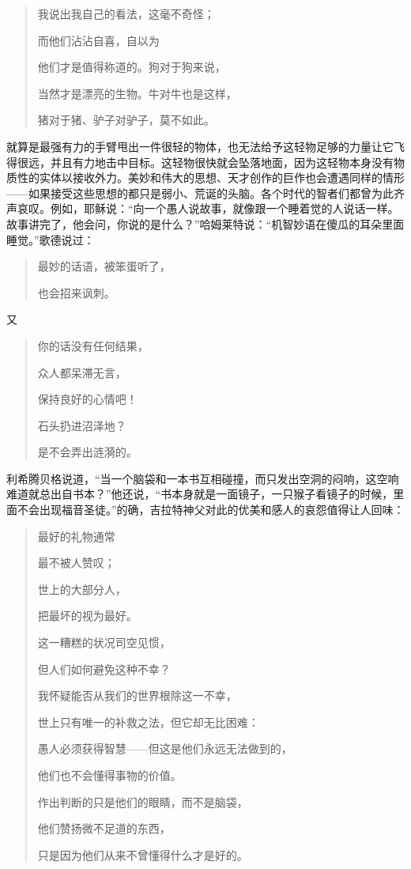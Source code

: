 \documentclass[12pt,oneside]{book}
\begin{document}
 
\begin{quotation}
我说出我自己的看法，这毫不奇怪；

而他们沾沾自喜，自以为 

他们才是值得称道的。狗对于狗来说， 

当然才是漂亮的生物。牛对牛也是这样， 

猪对于猪、驴子对驴子，莫不如此。 
\end{quotation}


就算是最强有力的手臂甩出一件很轻的物体，也无法给予这轻物足够的力量让它飞得很远，并且有力地击中目标。这轻物很快就会坠落地面，因为这轻物本身没有物质性的实体以接收外力。美妙和伟大的思想、天才创作的巨作也会遭遇同样的情形——如果接受这些思想的都只是弱小、荒诞的头脑。各个时代的智者们都曾为此齐声哀叹。例如，耶稣说：“向一个愚人说故事，就像跟一个睡着觉的人说话一样。故事讲完了，他会问，你说的是什么？”哈姆莱特说：“机智妙语在傻瓜的耳朵里面睡觉。”歌德说过： 

 
\begin{quotation}
最妙的话语，被笨蛋听了， 

也会招来讽刺。 
\end{quotation}


又 

\begin{quotation}
你的话没有任何结果， 

众人都呆滞无言， 

保持良好的心情吧！ 

石头扔进沼泽地？

是不会弄出涟漪的。 
\end{quotation}

 

利希腾贝格说道，“当一个脑袋和一本书互相碰撞，而只发出空洞的闷响，这空响难道就总出自书本？”他还说，“书本身就是一面镜子，一只猴子看镜子的时候，里面不会出现福音圣徒。”的确，吉拉特神父对此的优美和感人的哀怨值得让人回味： 

 
\begin{quotation}
最好的礼物通常 

最不被人赞叹； 

世上的大部分人， 

把最坏的视为最好。

这一糟糕的状况司空见惯， 

但人们如何避免这种不幸？ 

我怀疑能否从我们的世界根除这一不幸， 

世上只有唯一的补救之法，但它却无比困难： 

愚人必须获得智慧——但这是他们永远无法做到的， 

他们也不会懂得事物的价值。 

作出判断的只是他们的眼睛，而不是脑袋， 

他们赞扬微不足道的东西， 

只是因为他们从来不曾懂得什么才是好的。 
\end{quotation}
\end{document}
